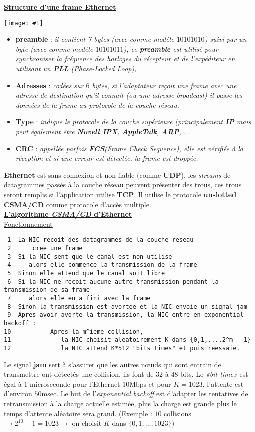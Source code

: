 \documentclass{article}
\newcommand{\imgR}[2]{\begin{center}\texttt{[image: \#1]}\end{center}}
\newcommand{\bfp}[2]{\item \textbf{#1} : \textit{#2}}
\newcommand{\stitre}[1]{\noindent\textbf{\underline{#1}} \\}
\newcommand{\neuSPs}{n\oe uds }
\begin{document}
\stitre{Structure d'une frame Ethernet}

\imgR{CN_116.png}{250}
\begin{itemize}
\bfp{preamble}{il contient 7 bytes (avec comme modèle $10101010$) suivi par un byte (avec comme modèle 
$10101011$), ce \textbf{preamble} est utilisé pour synchroniser la fréquence des horloges du récepteur et de 
l'expéditeur en utilisant un \textbf{PLL} \textit{(Phase-Locked Loop)},}
\bfp{Adresses}{codées sur $6$ bytes, si l'adaptateur reçoit une frame avec une adresse de destination qu'il 
connait (ou une adresse broadcast) il passe les données de la frame au protocole de la couche réseau,}
\bfp{Type}{indique le protocole de la couche supérieure (principalement \textbf{IP} mais peut également être 
\textbf{Novell IPX}, \textbf{AppleTalk}, \textbf{ARP}, ...}
\bfp{CRC}{appellée parfois \textbf{FCS}\textit{(Frame Check Sequence)}, elle est vérifiée à la réception et si 
une erreur est détectée, la frame est droppée.} \\
\end{itemize}

\noindent \textbf{Ethernet} est sans connexion et non fiable (comme \textbf{UDP}), les \textit{streams} de 
datagrammes passés à la couche réseau peuvent présenter des trous, ces trous seront remplis si l'application 
utilise \textbf{TCP}. Il utilise le protocole \textbf{unslotted CSMA/CD} comme protocole d'accès multiple.\\

\stitre{L'algorithme \textit{CSMA/CD} d'Ethernet}

\underline{Fonctionnement}

\begin{lstlisting}
 1  La NIC recoit des datagrammes de la couche reseau
 2      cree une frame
 3  Si la NIC sent que le canal est non-utilise 
 4     alors elle commence la transmission de la frame
 5  Sinon elle attend que le canal soit libre
 6  Si la NIC ne recoit aucune autre transmission pendant la transmission de sa frame
 7     alors elle en a fini avec la frame
 8  Sinon la transmission est avortee et la NIC envoie un signal jam
 9  Apres avoir avorte la transmission, la NIC entre en exponential backoff :
10           Apres la m^ieme collision, 
11              la NIC choisit aleatoirement K dans {0,1,...,2^m - 1}
12              la NIC attend K*512 "bits times" et puis reessaie.
\end{lstlisting}

\noindent Le signal \textbf{jam} sert à s'assurer que les autres \neuSPs qui sont entrain de transmettre ont 
détectés une collision, ils font de $32$ à $48$ bits. Le \textit{«bit time»} est égal à 1 microseconde pour 
l'Ethernet $10$Mbps et pour $K = 1023$, l'attente est d'environ $50$msec. Le but de l'\textit{exponential 
backoff} est d'adapter les tentatives de retransmission à la charge actuelle estimée, plus la charge est grande 
plus le temps d'attente aléatoire sera grand. (Exemple : $10$ collisions $\rightarrow 2^{10} - 1 = 1023 
\rightarrow$ on choisit $K$ dans $\{0,1,...,1023\}$) \\
\end{document}
